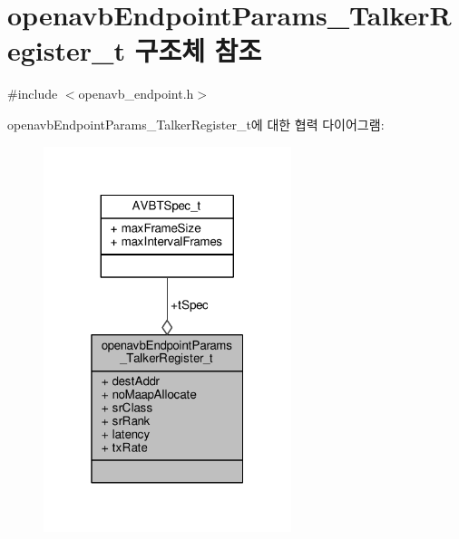 \hypertarget{structopenavb_endpoint_params___talker_register__t}{}\section{openavb\+Endpoint\+Params\+\_\+\+Talker\+Register\+\_\+t 구조체 참조}
\label{structopenavb_endpoint_params___talker_register__t}


{\ttfamily \#include $<$openavb\+\_\+endpoint.\+h$>$}



openavb\+Endpoint\+Params\+\_\+\+Talker\+Register\+\_\+t에 대한 협력 다이어그램\+:
\nopagebreak
\begin{figure}[H]
\begin{center}
\leavevmode
\includegraphics[width=205pt]{structopenavb_endpoint_params___talker_register__t__coll__graph}
\end{center}
\end{figure}
